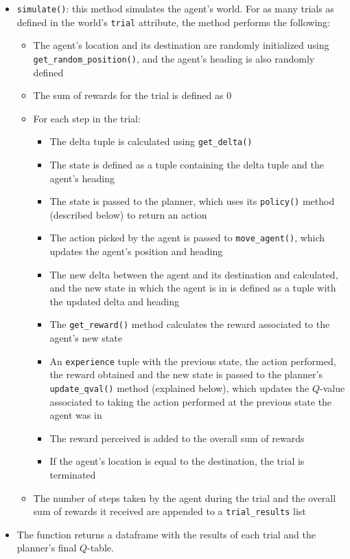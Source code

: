 \documentclass{article}
\begin{document}
\begin{itemize}
    \item \texttt{simulate()}: this method simulates the agent's world. For as many trials as defined in the world's \texttt{trial} attribute, the method performs the following:
    
    \begin{itemize}
        \item The agent's location and its destination are randomly initialized using \texttt{get\-\_random\-\_position()}, and the agent's heading is also randomly defined
        \item The sum of rewards for the trial is defined as 0
        \item For each step in the trial:
        
        \begin{itemize}
            \item The delta tuple is calculated using \texttt{get\_delta()}
            \item The state is defined as a tuple containing the delta tuple and the agent's heading
            \item The state is passed to the planner, which uses its \texttt{policy()} method (described below) to return an action
            \item The action picked by the agent is passed to \texttt{move\_agent()}, which updates the agent's position and heading
            \item The new delta between the agent and its destination and calculated, and the new state in which the agent is in is defined as a tuple with the updated delta and heading
            \item The \texttt{get\_reward()} method calculates the reward associated to the agent's new state
            \item An \texttt{experience} tuple with the previous state, the action performed, the reward obtained and the new state is passed to the planner's \texttt{update\_qval()} method (explained below), which updates the $Q$-value associated to taking the action performed at the previous state the agent was in
            \item The reward perceived is added to the overall sum of rewards
            \item If the agent's location is equal to the destination, the trial is terminated
        \end{itemize}
        
        \item The number of steps taken by the agent during the trial and the overall sum of rewards it received are appended to a \texttt{trial\_results} list
    \end{itemize}
    
    \item[] The function returns a dataframe with the results of each trial and the planner's final $Q$-table.
\end{itemize}
\end{document}
